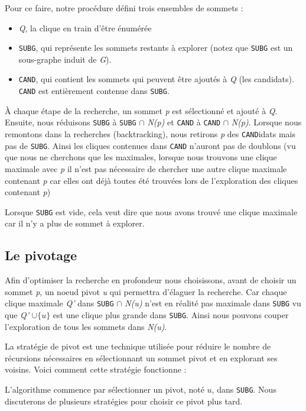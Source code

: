 \documentclass[12pt,a4paper]{article}
\begin{document}
Pour ce faire, notre procédure défini trois ensembles de sommets :
\begin{itemize}
  \item \emph{Q}, la clique en train d'être énumérée
  \item \texttt{SUBG}, qui représente les sommets restants à explorer (notez que \texttt{SUBG} est un sous-graphe induit de \emph{G}).
  \item \texttt{CAND}, qui contient les sommets qui peuvent être ajoutés à \emph{Q} (les candidats). \texttt{CAND} est entièrement contenue dans \texttt{SUBG}.
\end{itemize}
À chaque étape de la recherche, un sommet \emph{p} est sélectionné et ajouté à \emph{Q}.  Ensuite, nous réduisons \texttt{SUBG} à \texttt{SUBG} \(\cap\) \emph{N(p)} et \texttt{CAND} à \texttt{CAND} \(\cap\) \emph{N(p)}. Lorsque nous remontons dans la recherches (backtracking), nous retirons \emph{p} des \texttt{CAND}idats mais pas de \texttt{SUBG}. Ainsi les cliques contenues dans \texttt{CAND} n'auront pas de doublons (vu que nous ne cherchons que les maximales, lorsque nous trouvons une clique maximale avec \emph{p} il n'est pas nécessaire de chercher une autre clique maximale contenant \emph{p} car elles ont déjà toutes été trouvées lors de l'exploration des cliques contenant \emph{p})

Lorsque \texttt{SUBG} est vide, cela veut dire que nous avons trouvé une clique maximale car il n'y a plus de sommet à explorer.

\subsection{Le pivotage}%
\label{subsec:pivotage}


Afin d'optimiser la recherche en profondeur nous choisissons, avant de choisir un sommet \emph{p}, un noeud pivot \emph{u} qui permettra d'élaguer la recherche. Car chaque clique maximale \emph{Q'} dans \texttt{SUBG} \(\cap\) \emph{N(u)} n'est en réalité pas maximale dans \texttt{SUBG} vu que \emph{Q'} \(\cup \{u\}\) est une clique plus grande dans \texttt{SUBG}. Ainsi nous pouvons couper l'exploration de tous les sommets dans \emph{N(u)}.


La stratégie de pivot est une technique utilisée pour réduire le nombre de récursions nécessaires en sélectionnant un sommet pivot et en explorant ses voisins. Voici comment cette stratégie fonctionne :

L'algorithme commence par sélectionner un pivot, noté \( u \), dans \texttt{SUBG}. Nous discuterons de plusieurs stratégies pour choisir ce pivot plus tard.
\end{document}
